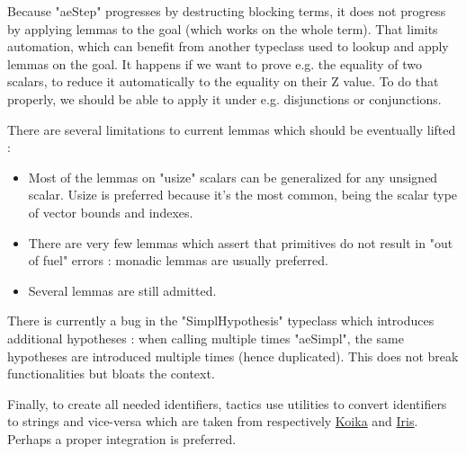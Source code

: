 \documentclass{article}
\begin{document}
\medskip

Because "aeStep" progresses by destructing blocking terms, it does not progress by applying lemmas to the goal (which works on the whole term). That limits automation, which can benefit from another typeclass used to lookup and apply lemmas on the goal. It happens if we want to prove e.g. the equality of two scalars, to reduce it automatically to the equality on their Z value. To do that properly, we should be able to apply it under e.g. disjunctions or conjunctions.

\medskip

There are several limitations to current lemmas which should be eventually lifted :
\begin{itemize}
    \item Most of the lemmas on "usize" scalars can be generalized for any unsigned scalar. Usize is preferred because it's the most common, being the scalar type of vector bounds and indexes.
    \item There are very few lemmas which assert that primitives do not result in "out of fuel" errors : monadic lemmas are usually preferred.
    \item Several lemmas are still admitted.
\end{itemize}

\medskip

There is currently a bug in the "SimplHypothesis" typeclass which introduces additional hypotheses : when calling multiple times "aeSimpl", the same hypotheses are introduced multiple times (hence duplicated). This does not break functionalities but bloats the context.

\medskip

Finally, to create all needed identifiers, tactics use utilities to convert identifiers to strings and vice-versa which are taken from respectively \href{https://github.com/mit-plv/koika/blob/master/coq/IdentParsing.v}{Koika} and \href{https://gitlab.mpi-sws.org/iris/iris/-/blob/master/iris/proofmode/string_ident.v}{Iris}. Perhaps a proper integration is preferred.

\printbibliography
\end{document}
